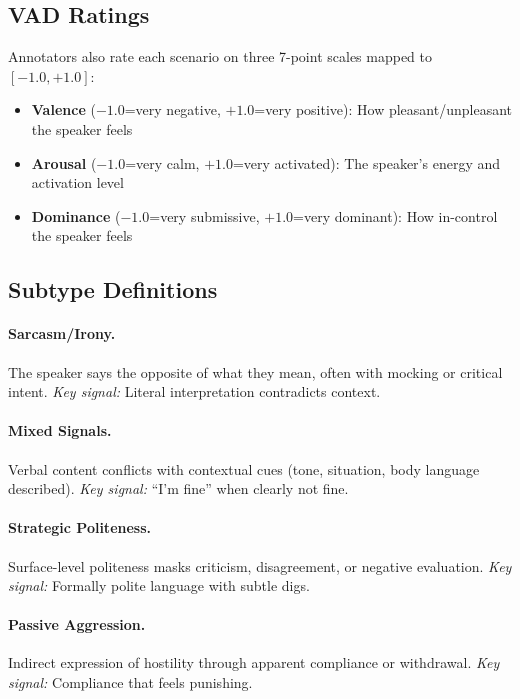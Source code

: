 \documentclass[twoside,11pt]{article}
\begin{document}
\subsection{VAD Ratings}

Annotators also rate each scenario on three 7-point scales mapped to $[-1.0, +1.0]$:

\begin{itemize}[leftmargin=*,noitemsep]
    \item \textbf{Valence} ($-1.0$=very negative, $+1.0$=very positive): How pleasant/unpleasant the speaker feels
    \item \textbf{Arousal} ($-1.0$=very calm, $+1.0$=very activated): The speaker's energy and activation level
    \item \textbf{Dominance} ($-1.0$=very submissive, $+1.0$=very dominant): How in-control the speaker feels
\end{itemize}

\subsection{Subtype Definitions}

\paragraph{Sarcasm/Irony.} The speaker says the opposite of what they mean, often with mocking or critical intent. \textit{Key signal:} Literal interpretation contradicts context.

\paragraph{Mixed Signals.} Verbal content conflicts with contextual cues (tone, situation, body language described). \textit{Key signal:} ``I'm fine'' when clearly not fine.

\paragraph{Strategic Politeness.} Surface-level politeness masks criticism, disagreement, or negative evaluation. \textit{Key signal:} Formally polite language with subtle digs.

\paragraph{Passive Aggression.} Indirect expression of hostility through apparent compliance or withdrawal. \textit{Key signal:} Compliance that feels punishing.
\end{document}

